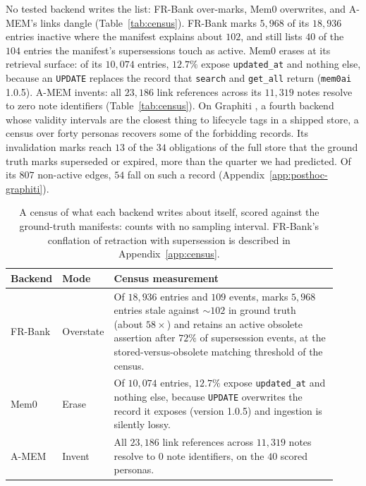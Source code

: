 \documentclass{article}
\newcommand{\censusalias}{\label{tab:believed}}
\begin{document}
No tested backend writes the list: FR-Bank over-marks, Mem0 overwrites, and A-MEM's links dangle (Table~\ref{tab:census}).
FR-Bank marks $5{,}968$ of its $18{,}936$ entries inactive where the manifest explains about $102$, and still lists $40$ of the $104$ entries the manifest's supersessions touch as active.
Mem0 erases at its retrieval surface: of its $10{,}074$ entries, $12.7\%$ expose \texttt{updated\_at} and nothing else, because an \texttt{UPDATE} replaces the record that \texttt{search} and \texttt{get\_all} return (\texttt{mem0ai} 1.0.5).
A-MEM invents: all $23{,}186$ link references across its $11{,}319$ notes resolve to zero note identifiers (Table~\ref{tab:census}).
On Graphiti \citep{zep}, a fourth backend whose validity intervals are the closest thing to lifecycle tags in a shipped store, a census over forty personas recovers some of the forbidding records.
Its invalidation marks reach $13$ of the $34$ obligations of the full store that the ground truth marks superseded or expired, more than the quarter we had predicted.
Of its $807$ non-active edges, $54$ fall on such a record (Appendix~\ref{app:posthoc-graphiti}).

\begin{table}[h]
\caption{A census of what each backend writes about itself, scored against the ground-truth manifests: counts with no sampling interval. FR-Bank's conflation of retraction with supersession is described in Appendix~\ref{app:census}.}
\label{tab:census}\censusalias%
\centering
\scriptsize
\setlength{\tabcolsep}{2pt}
\begin{tabular}{@{}p{0.12\linewidth}p{0.10\linewidth}p{0.70\linewidth}@{}}
\toprule
Backend & Mode & Census measurement \\
\midrule
FR-Bank & Overstate & Of $18{,}936$ entries and $109$ events, marks $5{,}968$ entries stale against ${\sim}102$ in ground truth (about $58\times$) and retains an active obsolete assertion after $72\%$ of supersession events, at the stored-versus-obsolete matching threshold of the census. \\
Mem0 & Erase & Of $10{,}074$ entries, $12.7\%$ expose \texttt{updated\_at} and nothing else, because \texttt{UPDATE} overwrites the record it exposes (version 1.0.5) and ingestion is silently lossy. \\
A-MEM & Invent & All $23{,}186$ link references across $11{,}319$ notes resolve to $0$ note identifiers, on the $40$ scored personas. \\
\bottomrule
\end{tabular}
\end{table}
\end{document}
